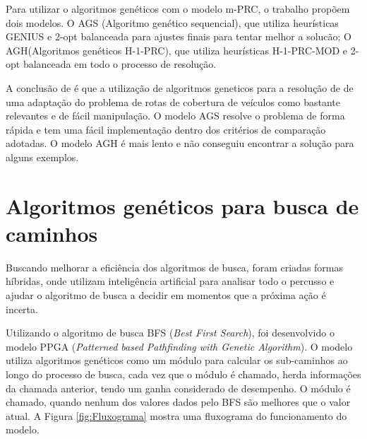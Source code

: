 \begin{minipage}{\linewidth}
	\label{fig:GrafoVUW}
\end{minipage}

Para utilizar o algoritmos genéticos com o modelo m-PRC, o trabalho propõem dois modelos. O AGS (Algoritmo genético sequencial), que utiliza heurísticas GENIUS e 2-opt balanceada para ajustes finais para tentar melhor a solucão; O AGH(Algoritmos genéticos H-1-PRC), que utiliza heurísticas H-1-PRC-MOD e 2-opt balanceada em todo o processo de resolução.

A conclusão de \cite{Washington} é que a utilização de algoritmos geneticos para a resolução de de uma adaptação do problema de rotas de cobertura de veículos como bastante relevantes e de fácil manipulação. O modelo AGS resolve o problema de forma rápida e tem uma fácil implementação dentro dos critérios de comparação adotadas. O modelo AGH é mais lento e não conseguiu encontrar a solução para alguns exemplos.

\section{Algoritmos genéticos para busca de caminhos}

Buscando melhorar a eficiência dos algoritmos de busca, foram criadas formas híbridas, onde utilizam inteligência artificial para analisar todo o percusso e ajudar o algoritmo de busca a decidir em momentos que a próxima ação é incerta.

Utilizando o algoritmo de busca BFS (\textit{Best First Search}), foi desenvolvido o modelo PPGA (\textit{Patterned based Pathfinding with Genetic Algorithm}). O modelo utiliza algoritmos genéticos como um módulo para calcular os sub-caminhos ao longo do processo de busca, cada vez que o módulo é chamado, herda informações da chamada anterior, tendo um ganha considerado de desempenho. O módulo é chamado, quando nenhum dos valores dados pelo BFS são melhores que o valor atual. A Figura \ref{fig:Fluxograma}  mostra uma fluxograma do funcionamento do modelo.

